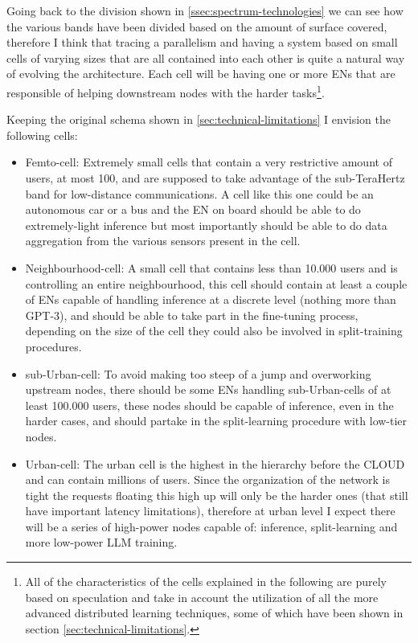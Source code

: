 Going back to the division shown in \ref{ssec:spectrum-technologies} we can see how the various
bands have been divided based on the amount of surface covered, therefore I think that tracing a
parallelism and having a system based on small cells of varying sizes that are all contained into
each other is quite a natural way of evolving the architecture. Each cell will be having one or more
ENs that are responsible of helping downstream nodes with the harder tasks\footnote{All of the
	characteristics of the cells explained in the following are purely based on speculation and take in
	account the utilization of all the more advanced distributed learning techniques, some of which have
	been shown in section \ref{sec:technical-limitations}.}.

Keeping the original schema shown in \ref{sec:technical-limitations} I envision the following cells:
\begin{itemize}
	\item Femto-cell: Extremely small cells that contain a very restrictive amount of users, at
	      most 100, and are supposed to take advantage of the sub-TeraHertz band for low-distance
	      communications. A cell like this one could be an autonomous car or a bus and the EN on board should be able to do extremely-light inference but most importantly should be able to do data aggregation from the various
	      sensors present in the cell.
	\item Neighbourhood-cell: A small cell that contains less than 10.000 users and is
	      controlling an entire neighbourhood, this cell should contain at least a couple of ENs
	      capable of handling inference at a discrete level (nothing more than GPT-3), and should be
	      able to take part in the fine-tuning process, depending on the size of the cell they could
	      also be involved in split-training procedures.
	\item sub-Urban-cell: To avoid making too steep of a jump and overworking upstream nodes,
	      there should be some ENs handling sub-Urban-cells of at least 100.000 users, these nodes
	      should be capable of inference, even in the harder cases, and should partake in the
	      split-learning procedure with low-tier nodes.
	\item Urban-cell: The urban cell is the highest in the hierarchy before the CLOUD and can
	      contain millions of users. Since the organization of the network is tight the requests
	      floating this high up will only be the harder ones (that still have important latency
	      limitations), therefore at urban level I expect there will be a series of high-power nodes
	      capable of: inference, split-learning and more low-power LLM training.
\end{itemize}

